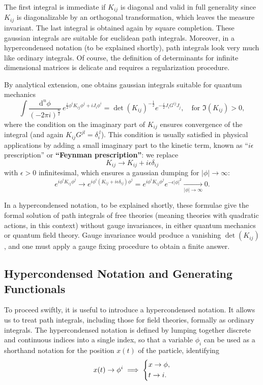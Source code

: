 The first integral is immediate if \(K_{ij}\) is diagonal and valid in full generality since \(K_{ij}\) is diagonalizable by an orthogonal transformation, which leaves the measure invariant. The last integral is obtained again by square completion. These gaussian integrals are suitable for euclidean path integrals. Moreover, in a hypercondensed notation (to be explained shortly), path integrals look very much like ordinary integrals. Of course, the definition of determinants for infinite dimensional matrices is delicate and requires a regularization procedure.

By analytical extension, one obtains gaussian integrals suitable for quantum mechanics
\begin{equation}
    \int \frac{\mathrm{d}^n \phi}{(-2\pi i)^{\tfrac{n}{2}}} \, e^{\frac{i}{2} \phi^i K_{ij} \phi^j + i J_i \phi^i} = \det(K_{ij})^{-\frac{1}{2}} e^{-\frac{i}{2} J_i G^{ij} J_j}, \quad \text{for } \Im(K_{ij}) > 0,
    \label{eq:QM_gaussian_integral}
\end{equation}
where the condition on the imaginary part of \(K_{ij}\) ensures convergence of the integral (and again \(K_{ij}G^{jl}=\delta_i^{\ l}\)). This condition is usually satisfied in physical applications by adding a small imaginary part to the kinetic term, known as “\(i\epsilon\) prescription” or \textbf{“Feynman prescription”}: we replace
\[
    K_{ij} \to K_{ij} + i \epsilon \delta_{ij}
\]
with \(\epsilon > 0\) infinitesimal, which ensures a gaussian dumping for \(\vert \phi \vert \to \infty \):
\[
    e^{i \phi^i K_{ij} \phi^j} \to e^{i \phi^i (K_{ij} + i \epsilon \delta_{ij}) \phi^j} = e^{i \phi^i K_{ij} \phi^j} e^{-\epsilon \vert \phi \vert^2} \xrightarrow[\vert \phi \vert \to \infty]{} 0.
\]

In a hypercondensed notation, to be explained shortly, these formulae give the formal solution of path integrals of free theories (meaning theories with quadratic actions, in this context) without gauge invariances, in either quantum mechanics or quantum field theory. Gauge invariance would produce a vanishing \(\det(K_{ij})\), and one must apply a gauge fixing procedure to obtain a finite answer.

\subsection{Hypercondensed Notation and Generating Functionals}

To proceed swiftly, it is useful to introduce a hypercondensed notation. It allows us to treat path integrals, including those for field theories, formally as ordinary integrals. The hypercondensed notation is defined by lumping together discrete and continuous indices into a single index, so that a variable \(\phi_i\) can be used as a shorthand notation for the position \(x(t)\) of the particle, identifying
\[
    x(t) \to \phi^i \implies \begin{dcases}
        x \to \phi, \\
        t \to i.
    \end{dcases}
\]

